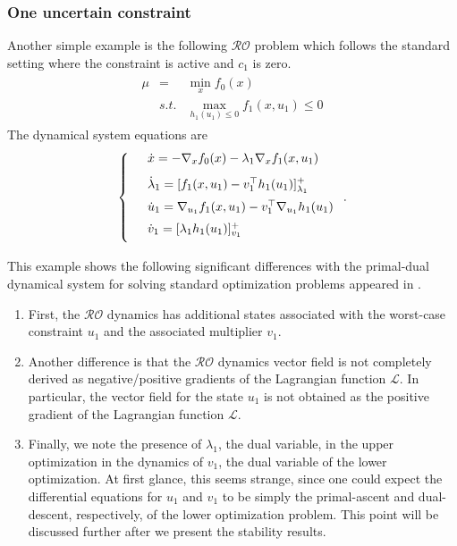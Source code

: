 \documentclass[journal,twoside,web]{ieeecolor}
\newcommand{\rev}[1]{#1}
\begin{document}
\subsubsection{One uncertain constraint}
Another simple example is the following $\mathcal{RO}$ problem which follows the standard setting where the constraint is active and $c_1$ is zero.
\begin{align*}
\begin{array}{lcl}\mu&=&\displaystyle\min_x f_0(x)\\
&s.t.&\displaystyle \max_{h_1(u_1)\leq 0}f_1(x,u_1)\leq 0
\end{array}
\end{align*}
The dynamical system equations are
\begin{align*}
\left\{
\begin{array}{cl}
\vspace{3mm}
&\dot{x}=-\nabla_x f_0(x)-\lambda_1 \nabla_x f_1(x,u_1)\\
\vspace{2mm}
&\dot{\lambda}_1=[f_1(x,u_1)-v_1^\top h_1(u_1)]_{\lambda_1}^+\\
\vspace{2mm}
&\dot{u}_1=\nabla_{u_1} f_1(x,u_1)-v_1^\top \nabla_{u_1}h_1(u_1)\\
\vspace{2mm}
&\dot{v}_1=[\lambda_1h_1(u_1)]_{v_1}^+
\end{array}\right..
\end{align*}

This example shows the following significant differences with the primal-dual dynamical system for solving standard optimization problems appeared in \cite{feijer2010,cherukuri2016}.
\begin{enumerate}
\item First, the $\mathcal{RO}$ dynamics has additional states associated with the worst-case constraint \rev{$u_1$} and the associated multiplier $v_1$.
\item Another difference is that the $\mathcal{RO}$ dynamics vector field is not completely derived as negative/positive gradients of the Lagrangian function $\mathcal{L}$. In particular, the vector field for the state $u_1$ is not obtained as the positive gradient of the Lagrangian function $\mathcal{L}$.
\item Finally, we note the presence of $\lambda_1$, the dual variable, in the upper optimization in the dynamics of $v_1$, the dual variable of the lower optimization. At first glance, this seems strange, since one could expect the differential equations for $u_1$ and $v_1$ to be simply the primal-ascent and dual-descent, respectively, of the lower optimization problem. This point will be discussed further after we present the stability results.
\end{enumerate}
\end{document}
